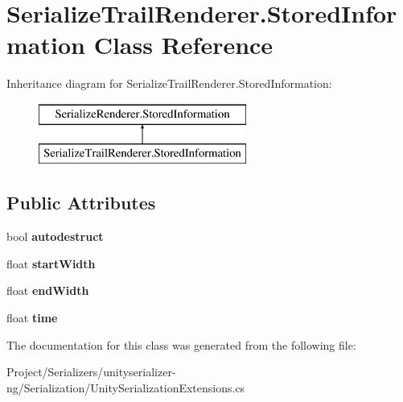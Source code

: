 \hypertarget{class_serialize_trail_renderer_1_1_stored_information}{}\section{Serialize\+Trail\+Renderer.\+Stored\+Information Class Reference}
\label{class_serialize_trail_renderer_1_1_stored_information}
Inheritance diagram for Serialize\+Trail\+Renderer.\+Stored\+Information\+:\begin{figure}[H]
\begin{center}
\leavevmode
\includegraphics[height=2.000000cm]{class_serialize_trail_renderer_1_1_stored_information}
\end{center}
\end{figure}
\subsection*{Public Attributes}
\begin{DoxyCompactItemize}
\item 
\mbox{\label{class_serialize_trail_renderer_1_1_stored_information_a65132d2d7d455bef7e5eef0fe5841383}} 
bool {\bfseries autodestruct}
\item 
\mbox{\label{class_serialize_trail_renderer_1_1_stored_information_a5e5883660f47fc7d05d1cda7341d74b5}} 
float {\bfseries start\+Width}
\item 
\mbox{\label{class_serialize_trail_renderer_1_1_stored_information_a3d74995a22c93639e0b74b7e26f5defa}} 
float {\bfseries end\+Width}
\item 
\mbox{\label{class_serialize_trail_renderer_1_1_stored_information_a1f83c23bd946bef81b12cd1d46faed05}} 
float {\bfseries time}
\end{DoxyCompactItemize}


The documentation for this class was generated from the following file\+:\begin{DoxyCompactItemize}
\item 
Project/\+Serializers/unityserializer-\/ng/\+Serialization/Unity\+Serialization\+Extensions.\+cs\end{DoxyCompactItemize}
